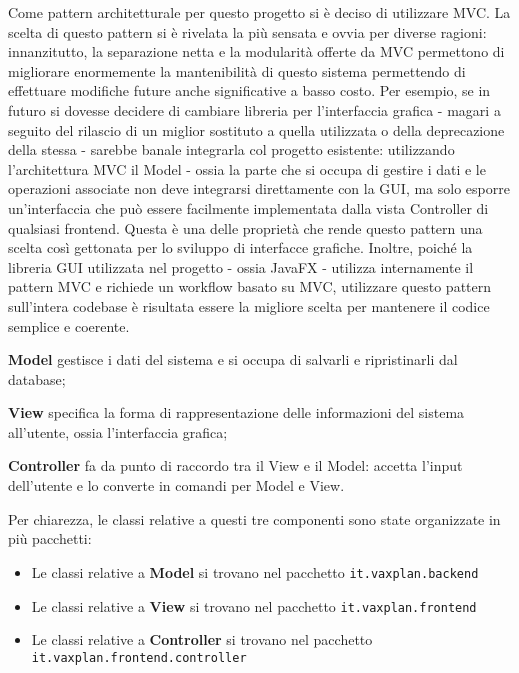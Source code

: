 \documentclass{article}
\begin{document}
Come pattern architetturale per questo progetto si è deciso di utilizzare MVC. La scelta di questo pattern si è rivelata la più sensata e ovvia per diverse ragioni: innanzitutto, la separazione netta e la modularità offerte da MVC permettono di migliorare enormemente la mantenibilità di questo sistema permettendo di effettuare modifiche future anche significative a basso costo. Per esempio, se in futuro si dovesse decidere di cambiare libreria per l'interfaccia grafica - magari a seguito del rilascio di un miglior sostituto a quella utilizzata o della deprecazione della stessa - sarebbe banale integrarla col progetto esistente: utilizzando l'architettura MVC il Model - ossia la parte che si occupa di gestire i dati e le operazioni associate non deve integrarsi direttamente con la GUI, ma solo esporre un'interfaccia che può essere facilmente implementata dalla vista Controller di qualsiasi frontend. Questa è una delle proprietà che rende questo pattern una scelta così gettonata per lo sviluppo di interfacce grafiche. Inoltre, poiché la libreria GUI utilizzata nel progetto - ossia JavaFX - utilizza internamente il pattern MVC e richiede un workflow basato su MVC, utilizzare questo pattern sull'intera codebase è risultata essere la migliore scelta per mantenere il codice semplice e coerente.

\begin{custlist}[,leftmargin=5.5em]
    \item[\textbf{Model}] gestisce i dati del sistema e si occupa di salvarli e ripristinarli dal database;
    \item[\textbf{View}] specifica la forma di rappresentazione delle informazioni del sistema all'utente, ossia l'interfaccia grafica;
    \item[\textbf{Controller}] fa da punto di raccordo tra il View e il Model: accetta l'input dell'utente e lo converte in comandi per Model e View.
\end{custlist}

Per chiarezza, le classi relative a questi tre componenti sono state organizzate in più pacchetti:

\begin{itemize}
    \item Le classi relative a \textbf{Model} si trovano nel pacchetto \texttt{it.vaxplan.backend}
    \item Le classi relative a \textbf{View} si trovano nel pacchetto \texttt{it.vaxplan.frontend}
    \item Le classi relative a \textbf{Controller} si trovano nel pacchetto \texttt{it.vaxplan.frontend.controller}
\end{itemize}
\end{document}
